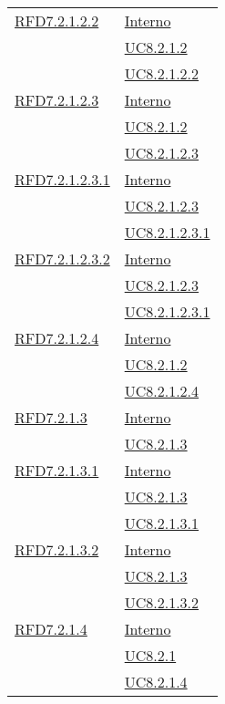 \begin{longtable}{|>{\centering}m{5cm}|m{5cm}<{\centering}|}
\hyperlink{RFD7.2.1.2.2}{RFD7.2.1.2.2} & \hyperlink{Interno}{Interno}\\
& \hyperref[UC8.2.1.2]{UC8.2.1.2}\\
& \hyperref[UC8.2.1.2.2]{UC8.2.1.2.2}\\ \hline

\hyperlink{RFD7.2.1.2.3}{RFD7.2.1.2.3} & \hyperlink{Interno}{Interno}\\
& \hyperref[UC8.2.1.2]{UC8.2.1.2}\\
& \hyperref[UC8.2.1.2.3]{UC8.2.1.2.3}\\ \hline

\hyperlink{RFD7.2.1.2.3.1}{RFD7.2.1.2.3.1} & \hyperlink{Interno}{Interno}\\
& \hyperref[UC8.2.1.2.3]{UC8.2.1.2.3}\\
& \hyperref[UC8.2.1.2.3.1]{UC8.2.1.2.3.1}\\ \hline

\hyperlink{RFD7.2.1.2.3.2}{RFD7.2.1.2.3.2} & \hyperlink{Interno}{Interno}\\
& \hyperref[UC8.2.1.2.3]{UC8.2.1.2.3}\\
& \hyperref[UC8.2.1.2.3.1]{UC8.2.1.2.3.1}\\ \hline

\hyperlink{RFD7.2.1.2.4}{RFD7.2.1.2.4} & \hyperlink{Interno}{Interno}\\
& \hyperref[UC8.2.1.2]{UC8.2.1.2}\\
& \hyperref[UC8.2.1.2.4]{UC8.2.1.2.4}\\ \hline

\hyperlink{RFD7.2.1.3}{RFD7.2.1.3} & \hyperlink{Interno}{Interno}\\
& \hyperref[UC8.2.1.3]{UC8.2.1.3}\\ \hline

\hyperlink{RFD7.2.1.3.1}{RFD7.2.1.3.1} & \hyperlink{Interno}{Interno}\\
& \hyperref[UC8.2.1.3]{UC8.2.1.3}\\
& \hyperref[UC8.2.1.3.1]{UC8.2.1.3.1}\\ \hline

\hyperlink{RFD7.2.1.3.2}{RFD7.2.1.3.2} & \hyperlink{Interno}{Interno}\\
& \hyperref[UC8.2.1.3]{UC8.2.1.3}\\
& \hyperref[UC8.2.1.3.2]{UC8.2.1.3.2}\\ \hline

\hyperlink{RFD7.2.1.4}{RFD7.2.1.4} & \hyperlink{Interno}{Interno}\\
& \hyperref[UC8.2.1]{UC8.2.1}\\
& \hyperref[UC8.2.1.4]{UC8.2.1.4}\\ \hline


\end{longtable}
